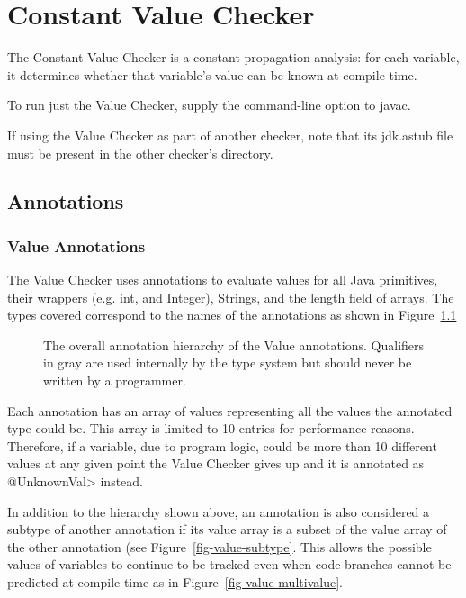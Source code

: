 \htmlhr
\chapter{Constant Value Checker\label{value-checker}}

The Constant Value Checker is a constant propagation analysis: for
each variable, it determines whether that variable's value can be
known at compile time.

To run just the Value Checker, supply the
command-line option to javac.

If using the Value Checker as part of another checker, note that its
jdk.astub file must be present in the other checker's directory.

\section{Annotations}
\subsection{Value Annotations}

The Value Checker uses annotations to evaluate values for all Java
primitives, their wrappers (e.g. int, and Integer), Strings, and the
length field of arrays. The types covered correspond to the names of
the annotations as shown in Figure~\ref{fig-value-hierarchy}

\begin{figure}
\caption{The overall annotation hierarchy of the Value
annotations. Qualifiers in gray are used
internally by the type system but should never be written by a
programmer.}
\label{fig-value-hierarchy}
\end{figure}

Each annotation has an array of values representing all the values the
annotated type could be. This array is limited to 10 entries for
performance reasons. Therefore, if a variable, due to program logic,
could be more than 10 different values at any given point the Value
Checker gives up and it is annotated as \<@UnknownVal> instead.

In addition to the hierarchy shown above, an annotation is also
considered a subtype of another annotation if its value array is a
subset of the value array of the other annotation (see
Figure~\ref{fig-value-subtype}. This allows the possible values of
variables to continue to be tracked even when code branches cannot be
predicted at compile-time as in Figure~\ref{fig-value-multivalue}.

